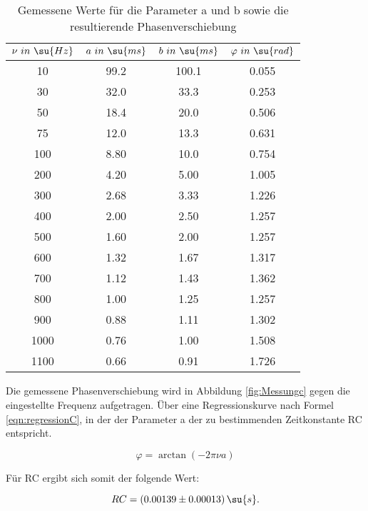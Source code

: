 \begin{table}
  \centering
  \caption{Gemessene Werte für die Parameter a und b sowie die \\ resultierende Phasenverschiebung}
  \label{tab:Phasenverschiebung}
  \begin{tabular}{c c c c}
    \toprule $\nu \,\, in  \,\, \su{Hz}$ & $a \,\, in \,\, \su{ms}$ &
             $b \,\, in \,\, \su{ms}$ & $\varphi \,\, in \,\, \su{rad}$ \\
    \midrule
     10 & 99.2 & 100.1 & 0.055 \\
     30 & 32.0 &  33.3 & 0.253 \\
     50 & 18.4 &  20.0 & 0.506 \\
     75 & 12.0 &  13.3 & 0.631 \\
    100 & 8.80 &  10.0 & 0.754 \\
    200 & 4.20 &  5.00 & 1.005 \\
    300 & 2.68 &  3.33 & 1.226 \\
    400 & 2.00 &  2.50 & 1.257 \\
    500 & 1.60 &  2.00 & 1.257 \\
    600 & 1.32 &  1.67 & 1.317 \\
    700 & 1.12 &  1.43 & 1.362 \\
    800 & 1.00 &  1.25 & 1.257 \\
    900 & 0.88 &  1.11 & 1.302 \\
    1000 & 0.76 &  1.00 & 1.508 \\
    1100 & 0.66 &  0.91 & 1.726 \\
    \bottomrule
  \end{tabular}
\end{table}

\newpage

Die gemessene Phasenverschiebung wird in Abbildung \ref{fig:Messungc} gegen die
eingestellte Frequenz aufgetragen. Über eine Regressionskurve nach Formel
\eqref{eqn:regressionC}, in der der Parameter a der zu bestimmenden Zeitkonstante
RC entspricht.

\begin{equation}
  \varphi = \arctan (- 2 \pi \nu a)
  \label{eqn:regressionC}
\end{equation}

Für RC ergibt sich somit der folgende Wert:

\begin{equation}
  RC = (0.00139 \pm 0.00013) \, \su{s} .
\end{equation}

